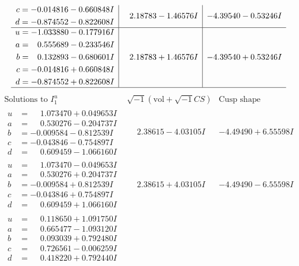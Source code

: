 \documentclass[1p]{elsarticle_modified}
\theoremstyle{definition}
\newcommand{\I}{\sqrt{-1}}
\begin{document}
$$\begin{array}{c|c|c}
\begin{aligned}
c &= -0.014816 - 0.660848 I \\
d &= -0.874552 - 0.822608 I\end{aligned}
 & \phantom{-}2.18783 - 1.46576 I & -4.39540 - 0.53246 I \\ \hline\begin{aligned}
u &= -1.033880 - 0.177916 I \\
a &= \phantom{-}0.555689 - 0.233546 I \\
b &= \phantom{-}0.132893 - 0.680601 I \\
c &= -0.014816 + 0.660848 I \\
d &= -0.874552 + 0.822608 I\end{aligned}
 & \phantom{-}2.18783 + 1.46576 I & -4.39540 + 0.53246 I\\
 \hline 
 \end{array}$$\newpage$$\begin{array}{c|c|c}  
\text{Solutions to }I^u_{1}& \I (\text{vol} + \sqrt{-1}CS) & \text{Cusp shape}\\
 \hline 
\begin{aligned}
u &= \phantom{-}1.073470 + 0.049653 I \\
a &= \phantom{-}0.530276 - 0.204737 I \\
b &= -0.009584 - 0.812539 I \\
c &= -0.043846 - 0.754897 I \\
d &= \phantom{-}0.609459 - 1.066160 I\end{aligned}
 & \phantom{-}2.38615 - 4.03105 I & -4.49490 + 6.55598 I \\ \hline\begin{aligned}
u &= \phantom{-}1.073470 - 0.049653 I \\
a &= \phantom{-}0.530276 + 0.204737 I \\
b &= -0.009584 + 0.812539 I \\
c &= -0.043846 + 0.754897 I \\
d &= \phantom{-}0.609459 + 1.066160 I\end{aligned}
 & \phantom{-}2.38615 + 4.03105 I & -4.49490 - 6.55598 I \\ \hline\begin{aligned}
u &= \phantom{-}0.118650 + 1.091750 I \\
a &= \phantom{-}0.665477 - 1.093120 I \\
b &= \phantom{-}0.093039 + 0.792480 I \\
c &= \phantom{-}0.726561 - 0.006259 I \\
d &= \phantom{-}0.418220 + 0.792440 I\end{aligned}

\end{array}$$
\end{document}
